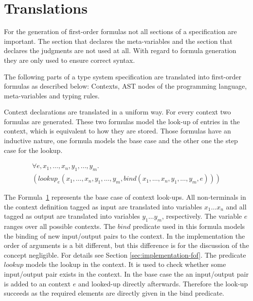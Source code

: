 \section{Translations}
\label{sec:translations}
For the generation of first-order formulas not all sections of a
specification are important. The section that declares the
meta-variables and the section that declares the judgments are not
used at all. With regard to formula generation they are only used to
ensure correct syntax.

The following parts of a type system specification are translated into
first-order formulas as described below: Contexts, AST nodes of
the programming language, meta-variables and typing rules.


Context declarations are translated in a uniform way. For every
context two formulas are generated. These two formulas model the
look-up of entries in the context, which is equivalent to how they
are stored. Those formulas have an inductive nature, one formula
models the base case and the other one the step case for the lookup.

\begin{figure}
\begin{multline}
  \forall e, x_1, \dots, x_n, y_1, \dots, y_m . \\
  (lookup_e(x_1,\dots,x_n,y_1,\dots,y_m,
  bind(x_1,\dots,x_n,y_1,\dots,y_m,e)))
\end{multline}
\label{formula:context-base}
\end{figure}

The Formula~\ref{formula:context-base} represents the base case of
context look-ups. All non-terminals in the context definition
tagged as input are translated into variables $x_1 \dots x_n$ and all
tagged as output are translated into variables $y_1 \dots y_m$,
respectively. The variable $e$ ranges over all possible
contexts. The $bind$ predicate used in this formula models the
binding of new input/output pairs to the context. In the
implementation the order of arguments is a bit different, but this
difference is for the discussion of the concept negligible. For
details see Section \ref{sec:implementation-fof}. The predicate
$lookup$ models the lookup in the context. It is used to check
whether some input/output pair exists in the context. In the base
case the an input/output pair is added to an context $e$ and
looked-up directly afterwards. Therefore the look-up succeeds as the
required elements are directly given in the bind predicate.

